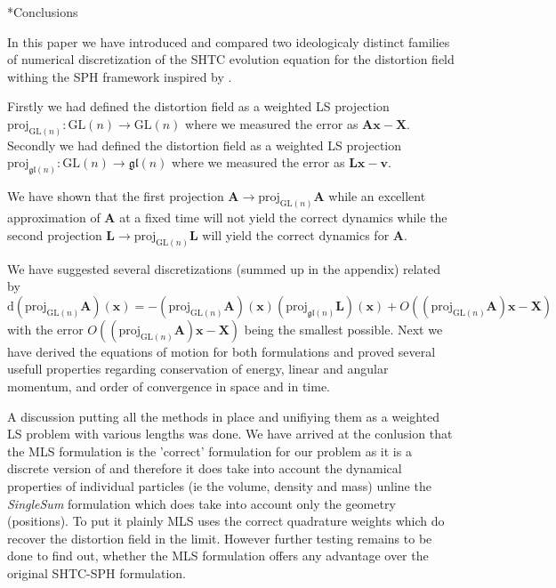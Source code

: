 \documentclass[oneside, a4paper, onecolumn, 11pt]{article}
\renewcommand{\AA}{\mathbf{A}}
\newcommand{\vv}{\mathbf{v}}
\newcommand{\xx}{\mathbf{x}}
\newcommand{\XX}{\mathbf{X}}
\newcommand{\diff}{\mathrm{d}}
\newcommand{\LL}{\mathbf{L}}
\newcommand{\proj}{\text{proj}}
\newcommand{\GL}{\mathrm{GL}(n)}%
\newcommand{\gl}{\mathfrak{gl}(n)}%
\begin{document}
\begin{section}*{Conclusions}


   In this paper we have introduced and compared two ideologicaly 
   distinct families of numerical discretization of the SHTC evolution
   equation for the distortion field  
   withing the SPH framework inspired by \cite{hutter-pavelka}.
   

   Firstly we had defined the distortion field as a weighted LS
   projection $\proj_{\GL} : \GL \rightarrow \GL$ where we
   measured the error as $ \AA \xx - \XX$.
   Secondly we had defined the distortion field as a weighted LS 
   projection $\proj_{\gl} : \GL \rightarrow \gl$ where we 
   measured the error as $\LL \xx - \vv$.

   We have shown that the first projection 
   $\AA \rightarrow \proj_{\GL}\AA$ while an excellent
   approximation of $\AA$ at a fixed time will not yield the 
   correct dynamics
   while the second projection 
   $\LL \rightarrow \proj_{\GL}\LL$ will yield the correct dynamics
   for $\AA$.
   
   We have suggested several discretizations 
   (summed up in the appendix) related by 
   $\diff \left(\proj_{\GL} \AA \right) (\xx) = -
   \left(\proj_{\GL} \AA \right)(\xx) \left( \proj_{\gl} \LL \right) (\xx) +
   O(\left( \proj_{\GL}\AA \right) \xx - \XX)$ with the error
   $O(\left( \proj_{\GL}\AA \right) \xx - \XX)$ being the
   smallest possible.
   Next we have derived the equations of motion for both formulations
   and proved several usefull properties regarding conservation
   of energy, linear and angular momentum, and order of convergence
   in space and in time.

   A discussion putting all the methods in place and unifiying them as
   a weighted LS problem with various lengths was done.
   We have arrived at the conlusion that the MLS formulation is the
   'correct' formulation for our problem as it is a discrete version 
   of  and therefore it does take into account the dynamical
   properties of individual particles (ie the volume, density and mass)
   unline the \textit{SingleSum} 
   formulation which does take into account only the geometry (positions).
   To put it plainly MLS uses the correct quadrature weights which do
   recover the distortion field in the limit.
   However further testing remains to be done to find out, whether 
   the MLS formulation offers any advantage over the original 
   SHTC-SPH formulation.



\end{section}
\end{document}
